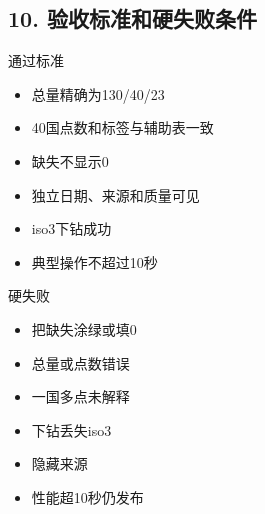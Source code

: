 \documentclass[UTF8,openany,zihao=-4]{ctexbook}
\renewcommand{\_}{\textunderscore\allowbreak}
\begin{document}
\subsection*{10. 验收标准和硬失败条件}
\begin{statusbox}{通过标准}
\begin{itemize}[label=$\square$]
\item 总量精确为130/40/23
\item 40国点数和标签与辅助表一致
\item 缺失不显示0
\item 独立日期、来源和质量可见
\item iso3下钻成功
\item 典型操作不超过10秒
\end{itemize}
\end{statusbox}
\begin{dangerbox}{硬失败}
\begin{itemize}
\item 把缺失涂绿或填0
\item 总量或点数错误
\item 一国多点未解释
\item 下钻丢失iso3
\item 隐藏来源
\item 性能超10秒仍发布
\end{itemize}
\end{dangerbox}
\end{document}
